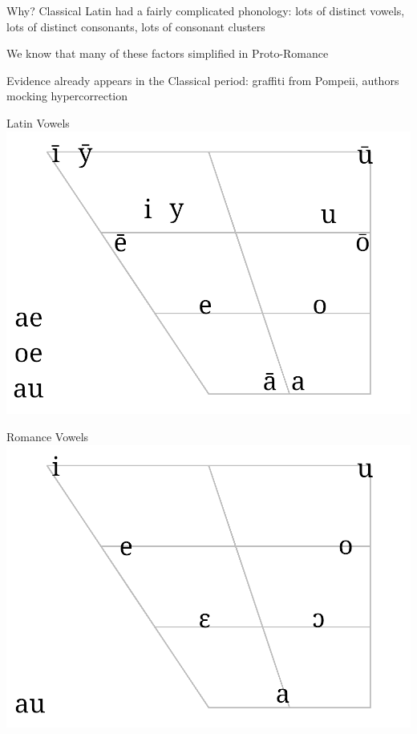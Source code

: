 \documentclass{beamer}
\begin{document}
\begin{frame}{Why?}
Classical Latin had a fairly complicated phonology: lots of distinct vowels, lots of distinct consonants, lots of consonant clusters

We know that many of these factors simplified in Proto-Romance

Evidence already appears in the Classical period: graffiti from Pompeii, authors mocking hypercorrection
\end{frame}

\begin{frame}{Latin Vowels}
\includegraphics[width=\linewidth]{latin_vowels}
\end{frame}

\begin{frame}{Romance Vowels}
\includegraphics[width=\linewidth]{romance_vowels}
\end{frame}
\end{document}
